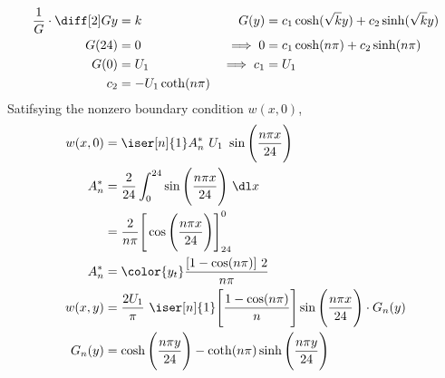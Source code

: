 \begin{enumerate}
\begin{align}
              \frac{1}{G} \cdot \diff[2] Gy & = k                               &
              G(y)                          & = c_1 \cosh(\sqrt{k}y)
              + c_2\sinh(\sqrt{k}y)                                               \\
              G(24)                         & = 0                               &
              \implies 0                    & = c_1\cosh(n\pi) + c_2\sinh(n\pi)   \\
              G(0)                          & = U_1                             &
              \implies c_1                  & = U_1                               \\
              c_2                           & = -U_1 \coth(n\pi)
          \end{align}
          Satifsying the nonzero boundary condition $ w(x, 0) $,
          \begin{align}
              w(x, 0) & = \iser[n]{1} A_n^*\ U_1\ \sin\Bigg(
              \frac{n\pi x}{24} \Bigg)                                   \\
              A_n^*   & = \frac{2}{24} \int_{0}^{24} \sin\Bigg(
              \frac{n\pi x}{24}\Bigg)\ \dl x                             \\
                      & = \frac{2}{n\pi} \Bigg[ \cos\Bigg( \frac{n\pi x}
              {24}\Bigg) \Bigg]_{24}^0                                   \\
              A_n^*   & = \color{y_t} \frac{[1 - \cos(n\pi)]\ 2}
              {n\pi}                                                     \\
              w(x, y) & = \frac{2U_1}{\pi}\ \iser[n]{1} \Bigg[
                  \frac{1 - \cos(n\pi)}{n}\Bigg] \sin\Bigg( \frac{n\pi x}
              {24}\Bigg) \cdot G_n(y)                                    \\
              G_n(y)  & =  \cosh\Bigg( \frac{n\pi y}{24} \Bigg)
              - \coth(n\pi) \sinh\Bigg( \frac{n\pi y}{24} \Bigg)
          \end{align}


\end{enumerate}
